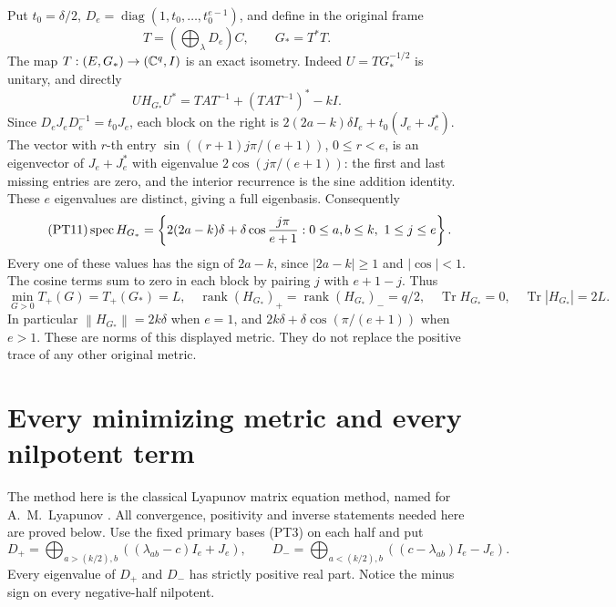 \documentclass[11pt,a4paper]{article}
\providecommand{\rank}{\operatorname{rank}}
\providecommand{\diag}{\operatorname{diag}}
\providecommand{\Tr}{\operatorname{Tr}}
\providecommand{\norm}[1]{\left\lVert#1\right\rVert}
\begin{document}
Put \(t_0=\delta/2\), \(D_e=\diag(1,t_0,\ldots,t_0^{e-1})\),
and define in the original frame
\begin{equation}\tag{PT10}
 T=\left(\bigoplus_\lambda D_e\right)C,\qquad G_*=T^*T.
\end{equation}
The map \(T:(E,G_*)\to(\mathbb C^q,I)\) is an exact isometry.
Indeed \(U=TG_*^{-1/2}\) is unitary, and directly
\[
 UH_{G_*}U^*=TAT^{-1}+(TAT^{-1})^*-kI.
\]
Since \(D_eJ_eD_e^{-1}=t_0J_e\), each block on the right is
\(2(2a-k)\delta I_e+t_0(J_e+J_e^*)\). The vector with
\(r\)-th entry \(\sin((r+1)j\pi/(e+1))\), \(0\le r<e\),
is an eigenvector of \(J_e+J_e^*\) with eigenvalue
\(2\cos(j\pi/(e+1))\): the first and last missing entries are
zero, and the interior recurrence is the sine addition identity.
These \(e\) eigenvalues are distinct, giving a full eigenbasis.
Consequently
\begin{equation}\tag{PT11}
 \operatorname{spec} H_{G_*}
 =\left\{2(2a-k)\delta+\delta\cos\frac{j\pi}{e+1}:
 0\le a,b\le k,\ 1\le j\le e\right\}.
\end{equation}
Every one of these values has the sign of \(2a-k\), since
\(|2a-k|\ge1\) and \(|\cos|<1\). The cosine terms sum to
zero in each block by pairing \(j\) with \(e+1-j\). Thus
\begin{equation}\tag{PT12}
 \min_{G>0}T_+(G)=T_+(G_*)=L,\quad
 \rank(H_{G_*})_+=\rank(H_{G_*})_-=q/2,\quad
 \Tr H_{G_*}=0,\quad\Tr|H_{G_*}|=2L.
\end{equation}
In particular \(\norm{H_{G_*}}=2k\delta\) when \(e=1\),
and \(2k\delta+\delta\cos(\pi/(e+1))\) when \(e>1\).
These are norms of this displayed metric. They do not replace
the positive trace of any other original metric.

\section{Every minimizing metric and every nilpotent term}

The method here is the classical Lyapunov matrix equation method,
named for A.~M.~Lyapunov \cite{a03pt:lyapunov}. All convergence,
positivity and inverse statements needed here are proved below.
Use the fixed primary bases (PT3) on each half and put
\begin{equation}\tag{PT13}
 D_+=\bigoplus_{a>(k/2),b}( (\lambda_{ab}-c)I_e+J_e),\qquad
 D_-=\bigoplus_{a<(k/2),b}( (c-\lambda_{ab})I_e-J_e).
\end{equation}
Every eigenvalue of \(D_+\) and \(D_-\) has strictly positive
real part. Notice the minus sign on every negative-half nilpotent.
\end{document}
